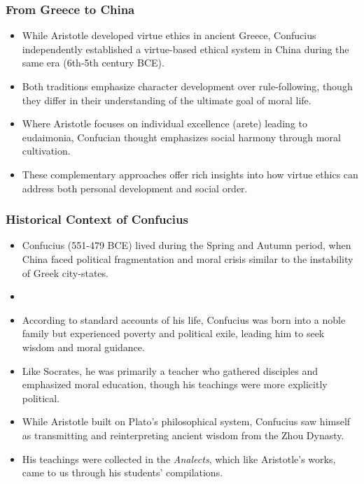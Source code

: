 \documentclass{beamer}
\begin{document}
\begin{frame}
    \frametitle{From Greece to China}
    \begin{itemize}
        \item While Aristotle developed virtue ethics in ancient Greece, Confucius independently established a virtue-based ethical system in China during the same era (6th-5th century BCE).
        
        \item Both traditions emphasize character development over rule-following, though they differ in their understanding of the ultimate goal of moral life.
        
        \item Where Aristotle focuses on individual excellence (arete) leading to eudaimonia, Confucian thought emphasizes social harmony through moral cultivation.
        
        \item These complementary approaches offer rich insights into how virtue ethics can address both personal development and social order.
    \end{itemize}
\end{frame}

\begin{frame}
    \frametitle{Historical Context of Confucius}
    \begin{itemize}
        \item Confucius (551-479 BCE) lived during the Spring and Autumn period, when China faced political fragmentation and moral crisis similar to the instability of Greek city-states.
        \item 
        \item According to standard accounts of his life, Confucius was born into a noble family but experienced poverty and political exile, leading him to seek wisdom and moral guidance.
        
        \item Like Socrates, he was primarily a teacher who gathered disciples and emphasized moral education, though his teachings were more explicitly political.
        
        \item While Aristotle built on Plato's philosophical system, Confucius saw himself as transmitting and reinterpreting ancient wisdom from the Zhou Dynasty.
        
        \item His teachings were collected in the \textit{Analects}, which like Aristotle's works, came to us through his students' compilations.
    \end{itemize}
\end{frame}
\end{document}
